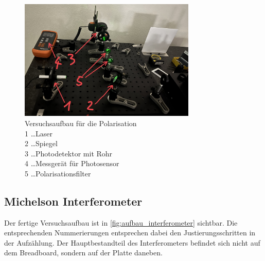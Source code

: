 \documentclass[12pt,english,ngerman]{scrartcl}
\begin{document}
\begin{figure}[H]
	\begin{center}
		\includegraphics[width =0.75\textwidth]{./figures/aufbau_polarisation.jpg}
	\end{center}
	\caption[Versuchsaufbau für die Polarisation] {
		Versuchsaufbau für die Polarisation       \\
		1 \dots Laser                                    \\
		2 \dots Spiegel                                                      \\
		3 \dots Photodetektor mit Rohr                         \\
		4 \dots Messgerät für Photosensor \\
		5 \dots Polarisationsfilter   
	}\label{fig:aufbau_polarisation}
\end{figure}


\subsection{Michelson Interferometer}

Der fertige Versuchsaufbau ist in \autoref{fig:aufbau_interferometer} sichtbar. Die entsprechenden Nummerierungen entsprechen dabei den 
Justierungsschritten in der Aufzählung. Der Hauptbestandteil des Interferometers befindet sich nicht auf dem Breadboard,
sondern auf der Platte daneben.
\end{document}
